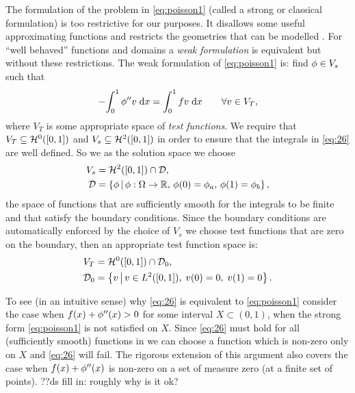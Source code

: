 The formulation of the problem in \cref{eq:poisson1} (called a strong or classical formulation) is too restrictive for our purposes.
It disallows some useful approximating functions and restricts the geometries that can be modelled \cite[14]{HowardElmanDavidSilvester2006}.
For ``well behaved'' functions and domains a \emph{weak formulation} is equivalent but without these restrictions.
The weak formulation of \cref{eq:poisson1} is: find $\phi\in V_{s}$ such that
\begin{equation}
  -{\int_0^1 \phi'' v {\; \mathrm{{d}}}{x}} = {\int_0^1 f v {\; \mathrm{{d}}}{x}} \qquad \forall v \in V_{T},
  \label{eq:26}
\end{equation}
where $V_{T}$ is some appropriate space of \emph{test functions}.
We require that $V_{T}\subseteq \mathcal{H}^0([0,1])$ and $V_s \subseteq \mathcal{H}^2([0,1])$ in order to ensure that the integrals in \cref{eq:26} are well defined.
So we as the solution space we choose
\begin{equation}
  \begin{aligned}
    V_{s} &= \mathcal{H}^2([0,1]) \cap \mathcal{D}, \\
    \mathcal{D} &= \left\{ {\phi} \,\middle|\, {\phi: \Omega \rightarrow \mathbb{R} ,\, \phi(0) = \phi_{a},\, \phi(1) = \phi_{b}} \right\},
  \end{aligned}
\end{equation}
\ie the space of functions that are sufficiently smooth for the integrals to be finite and that satisfy the boundary conditions.
Since the boundary conditions are automatically enforced by the choice of $V_s$ we choose test functions that are zero on the boundary, then an appropriate test function space is:
\begin{equation}
  \label{eq:28}
  \begin{aligned}
    V_{T} &= \mathcal{H}^0([0,1]) \cap \mathcal{D}_0, \\
    \mathcal{D}_0 &= \left\{ {v} \,\middle|\, {v \in L^2([0,1]),\; v(0) =0,\; v(1)=0} \right\}.
  \end{aligned}
\end{equation}

To see (in an intuitive sense) why \cref{eq:26} is equivalent to \cref{eq:poisson1} consider the case when $f(x) + \phi''(x) > 0$ for some interval $X \subset (0,1)$, \ie when the strong form \cref{eq:poisson1} is not satisfied on $X$.
Since \cref{eq:26} must hold for all (sufficiently smooth) functions in we can choose a function which is non-zero only on $X$ and \cref{eq:26} will fail.
The rigorous extension of this argument also covers the case when $f(x) + \phi''(x)$ is non-zero on a set of measure zero (\eg at a finite set of points). ??ds fill in: roughly why is it ok?

